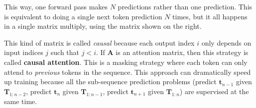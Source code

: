 This way, one forward pass makes $N$ predictions rather than one prediction. This is equivalent to doing a single next token prediction $N$ times, but it all happens in a single matrix multiply, using the matrix shown on the right.

This kind of matrix is called \textit{causal} because each output index $i$ only depends on input indices $j$ such that $j < i$. If $\mathbf{A}$ is an attention matrix, then this strategy is called \textbf{causal attention}. This is a masking strategy where each token can only attend to \textit{previous} tokens in the sequence. This approach can dramatically speed up training because all the sub-sequence prediction problems (predict $\mathbf{t}_{n-1}$ given $\mathbf{T}_{1:n-2}$, predict $\mathbf{t}_{n}$ given $\mathbf{T}_{1:n-1}$, predict $\mathbf{t}_{n+1}$ given $\mathbf{T}_{1:n}$) are supervised at the same time.

